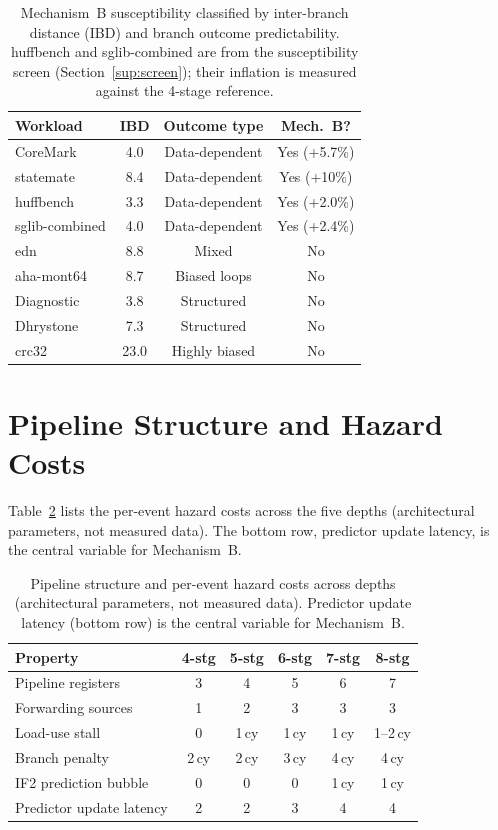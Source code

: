 \documentclass[acmsmall,nonacm,screen]{acmart}
\begin{document}
\begin{table}[h]
\centering
\caption{Mechanism~B susceptibility classified by inter-branch distance (IBD) and branch outcome predictability. huffbench and sglib-combined are from the susceptibility screen (Section~\ref{sup:screen}); their inflation is measured against the 4-stage reference.}
\label{tab:ibd}
\small
\begin{tabular}{@{}lccc@{}}
\toprule
\textbf{Workload} & \textbf{IBD} & \textbf{Outcome type} & \textbf{Mech.~B?} \\
\midrule
CoreMark       & 4.0  & Data-dependent  & Yes (+5.7\%) \\
statemate      & 8.4  & Data-dependent  & Yes (+10\%) \\
huffbench      & 3.3  & Data-dependent  & Yes (+2.0\%) \\
sglib-combined & 4.0  & Data-dependent  & Yes (+2.4\%) \\
edn            & 8.8  & Mixed           & No \\
aha-mont64     & 8.7  & Biased loops    & No \\
Diagnostic     & 3.8  & Structured      & No \\
Dhrystone      & 7.3  & Structured      & No \\
crc32          & 23.0 & Highly biased   & No \\
\bottomrule
\end{tabular}
\end{table}

\section{Pipeline Structure and Hazard Costs}
\label{sup:hazard}
Table~\ref{tab:hazard} lists the per-event hazard costs across the five depths
(architectural parameters, not measured data). The bottom row, predictor update
latency, is the central variable for Mechanism~B.

\begin{table}[h]
\centering
\caption{Pipeline structure and per-event hazard costs across depths (architectural parameters, not measured data). Predictor update latency (bottom row) is the central variable for Mechanism~B.}
\label{tab:hazard}
\small
\begin{tabular}{@{}lccccc@{}}
\toprule
\textbf{Property} & \textbf{4-stg} & \textbf{5-stg} & \textbf{6-stg} & \textbf{7-stg} & \textbf{8-stg} \\
\midrule
Pipeline registers        & 3 & 4 & 5 & 6 & 7 \\
Forwarding sources        & 1 & 2 & 3 & 3 & 3 \\
Load-use stall            & 0 & 1\,cy & 1\,cy & 1\,cy & 1--2\,cy \\
Branch penalty            & 2\,cy & 2\,cy & 3\,cy & 4\,cy & 4\,cy \\
IF2 prediction bubble     & 0 & 0 & 0 & 1\,cy & 1\,cy \\
Predictor update latency  & 2 & 2 & 3 & 4 & 4 \\
\bottomrule
\end{tabular}
\end{table}
\end{document}
